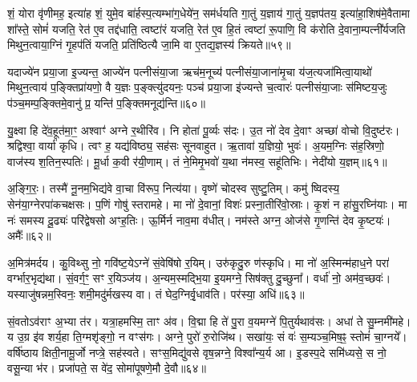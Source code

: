 शं॒ योरा वृ॑णीमह॒ इत्या॑ह शं॒ युमे॒व बा॑र्\mbox{}हस्प॒त्यम्भा॑ग॒धेये॑न॒ सम॑र्धयति गा॒तुं य॒ज्ञाय॑ गा॒तुं य॒ज्ञप॑तय॒ इत्या॑हा॒शिष॑मे॒वैतामा शा᳚स्ते॒ सोमं॑ यजति॒ रेत॑ ए॒व तद्द॑धाति॒ त्वष्टा॑रं यजति॒ रेत॑ ए॒व हि॒तं त्वष्टा॑ रू॒पाणि॒ वि क॑रोति दे॒वाना॒म्पत्नी᳚र्यजति मिथुन॒त्वाया॒ग्निं गृ॒हप॑तिं यजति॒ प्रति॑ष्ठित्यै जा॒मि वा ए॒तद्य॒ज्ञस्य॑ क्रियते॥५९॥

यदाज्ये॑न प्रया॒जा इ॒ज्यन्त॒ आज्ये॑न पत्नीसंया॒जा ऋच॑म॒नूच्य॑ पत्नीसंया॒जाना॑मृ॒चा य॑ज॒त्यजा॑मित्वा॒याथो॑ मिथुन॒त्वाय॑ प॒ङ्क्तिप्रा॑यणो॒ वै य॒ज्ञः प॒ङ्क्त्यु॑दयनः॒ पञ्च॑ प्रया॒जा इ॑ज्यन्ते च॒त्वारः॑ पत्नीसंया॒जाः स॑मिष्टय॒जुः प॑ञ्च॒मम्प॒ङ्क्तिमे॒वानु॑ प्र॒ यन्ति॑ प॒ङ्क्तिमनूद्य॑न्ति॥६०॥

{\anuvakamend[{प्र॒जायाः᳚ करोति॒ तत्क्रि॑यते॒ त्रय॑स्त्रिꣳशच्च॥10॥}]}

यु॒क्ष्वा हि दे॑व॒हूत॑मा॒ꣳ॒ अश्वाꣳ॑ अग्ने र॒थीरि॑व। नि होता॑ पू॒र्व्यः स॑दः। उ॒त नो॑ देव दे॒वाꣳ अच्छा॑ वोचो वि॒दुष्ट॑रः। श्रद्विश्वा॒ वार्या॑ कृधि। त्वꣳ ह॒ यद्य॑विष्ठ्य॒ सह॑सः सूनवाहुत। ऋ॒तावा॑ य॒ज्ञियो॒ भुवः॑। अ॒यम॒ग्निः स॑ह॒स्रिणो॒ वाज॑स्य श॒तिन॒स्पतिः॑। मू॒र्धा क॒वी र॑यी॒णाम्। तं ने॒मिमृ॒भवो॑ य॒था न॑मस्व॒ सहू॑तिभिः। नेदी॑यो य॒ज्ञम्॥६१॥

अ॒ङ्गि॒रः॒। तस्मै॑ नू॒नम॒भिद्य॑वे वा॒चा वि॑रूप॒ नित्य॑या। वृष्णे॑ चोदस्व सुष्टु॒तिम्। कमु॑ ष्विदस्य॒ सेन॑या॒ग्नेरपा॑कचक्षसः। प॒णिं गोषु॑ स्तरामहे। मा नो॑ दे॒वानां॒ विशः॑ प्रस्ना॒तीरि॑वो॒स्राः। कृ॒शं न हा॑सु॒रघ्नि॑याः। मा नः॑ समस्य दू॒ढ्यः॑ परि॑द्वेषसो अꣳह॒तिः। ऊ॒र्मिर्न नाव॒मा व॑धीत्। नम॑स्ते अग्न॒ ओज॑से गृ॒णन्ति॑ देव कृ॒ष्टयः॑। अमैः᳚॥६२॥

अ॒मित्र॑मर्दय। कु॒विथ्सु नो॒ गवि॑ष्ट॒ये\-ऽग्ने॑ सं॒वेषि॑षो र॒यिम्। उरु॑कृदु॒रु ण॑स्कृधि। मा नो॑ अ॒स्मिन्म॑हाध॒ने परा॑ वर्ग्भार॒भृद्य॑था। सं॒वर्ग॒ꣳ॒ सꣳ र॒यिञ्ज॑य। अ॒न्यम॒स्मद्भि॒या इ॒यमग्ने॒ सिष॑क्तु दु॒च्छुना᳚। वर्धा॑ नो॒ अम॑व॒च्छवः॑। यस्याजु॑षन्नम॒स्विनः॒ शमी॒मदु॑र्मखस्य वा। तं घेद॒ग्निर्वृ॒धाव॑ति। पर॑स्या॒ अधि॑॥६३॥

सं॒वतो\-ऽव॑राꣳ अ॒भ्या त॑र। यत्रा॒हमस्मि॒ ताꣳ अ॑व। वि॒द्मा हि ते॑ पु॒रा व॒यमग्ने॑ पि॒तुर्यथाव॑सः। अधा॑ ते सु॒म्नमी॑महे। य उ॒ग्र इ॑व शर्य॒हा ति॒ग्मशृ॑ङ्गो॒ न वꣳस॑गः। अग्ने॒ पुरो॑ रु॒रोजि॑थ। सखा॑यः॒ सं वः॑ स॒म्यञ्च॒मिष॒ꣴ॒ स्तोमं॑ चा॒ग्नये᳚। वर्\mbox{}षि॑ष्ठाय क्षिती॒नामू॒र्जो नप्त्रे॒ सह॑स्वते। सꣳस॒मिद्यु॑वसे वृष॒न्नग्ने॒ विश्वा᳚न्य॒र्य आ। इ॒डस्प॒दे समि॑ध्यसे॒ स नो॒ वसू॒न्या भ॑र। प्रजा॑पते॒ स वे॑द॒ सोमा॑पूषणे॒मौ दे॒वौ॥६४॥

{\anuvakamend[{य॒ज्ञममै॒रधि॑ वृष॒न्नेका॒न्नविꣳ॑श॒तिश्च॑॥11॥}]}

